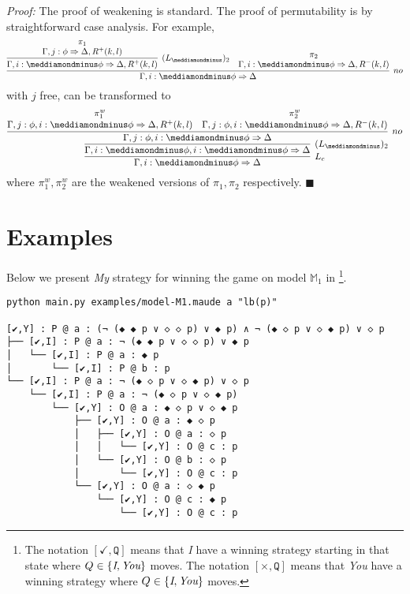 \documentclass{easychair}
\newcommand{\I}{\emph{I}\xspace}
\newcommand{\You}{\emph{You}\xspace}
\newcommand{\My}{\emph{My}\xspace}
\newcommand{\M}{\mathbb{M}}
\renewcommand{\qed}{\hfill$\blacksquare$}
\renewenvironment{proof}{\noindent\textit{Proof:}\quad}{\qed}
\newcommand{\dminus}{\meddiamondminus}
\begin{document}
\begin{proof} The proof of weakening is standard. The
proof of permutability is by straightforward case analysis. For example, 
\[
\infer[no]{\Gamma, i: \dminus \phi\Rightarrow \Delta}
{\infer[(L_{\dminus})_2]{\Gamma, i: \dminus \phi\Rightarrow \Delta,R^+(k,l)}{\deduce{\Gamma, j: \phi\Rightarrow \Delta,R^+(k,l)}{\pi_1}}&\deduce{\Gamma, i: \dminus \phi\Rightarrow \Delta,R^-(k,l)}{\pi_2}}
\]
with $j$ free, can be transformed to
\[
\infer[L_c]{\Gamma, i: \dminus  \phi\Rightarrow \Delta}
{\infer[(L_{\dminus})_2]{\Gamma, i: \dminus\phi, i: \dminus \phi\Rightarrow \Delta}
{\infer[no]{\Gamma, j:\phi, i: \dminus\phi \Rightarrow \Delta}
{\deduce{\Gamma, j:\phi, i: \dminus\phi \Rightarrow  \Delta, R^+(k,l)}{\pi_1^w}&\deduce{\Gamma, j:\phi, i: \dminus\phi \Rightarrow  \Delta, R^-(k,l)}{\pi_2^w}}}}\]
where $\pi_1^w, \pi_2^w$ are the weakened versions of $\pi_1,\pi_2$ respectively.
\end{proof}
 \section{Examples}\label{ap:examples}

Below we present  \My strategy for winning the game on  model $\M_1$ in 
\footnote{The notation $[\checkmark,\texttt{Q}]$ means that \I have a winning strategy starting in that state
where $Q\in \{\I, \You\}$ moves. 
The notation $[\times,\texttt{Q}]$ means that \You have a winning strategy
where $Q\in \{\I, \You\}$ moves. 
}.


\begin{Verbatim}[fontsize=\scriptsize]
python main.py examples/model-M1.maude a "lb(p)"

[✔,Y] : P @ a : (¬ (◆ ◆ p ∨ ◇ ◇ p) ∨ ◆ p) ∧ ¬ (◆ ◇ p ∨ ◇ ◆ p) ∨ ◇ p
├── [✔,I] : P @ a : ¬ (◆ ◆ p ∨ ◇ ◇ p) ∨ ◆ p
│   └── [✔,I] : P @ a : ◆ p
│       └── [✔,I] : P @ b : p
└── [✔,I] : P @ a : ¬ (◆ ◇ p ∨ ◇ ◆ p) ∨ ◇ p
    └── [✔,I] : P @ a : ¬ (◆ ◇ p ∨ ◇ ◆ p)
        └── [✔,Y] : O @ a : ◆ ◇ p ∨ ◇ ◆ p
            ├── [✔,Y] : O @ a : ◆ ◇ p
            │   ├── [✔,Y] : O @ a : ◇ p
            │   │   └── [✔,Y] : O @ c : p
            │   └── [✔,Y] : O @ b : ◇ p
            │       └── [✔,Y] : O @ c : p
            └── [✔,Y] : O @ a : ◇ ◆ p
                └── [✔,Y] : O @ c : ◆ p
                    └── [✔,Y] : O @ c : p
\end{Verbatim}
\end{document}
